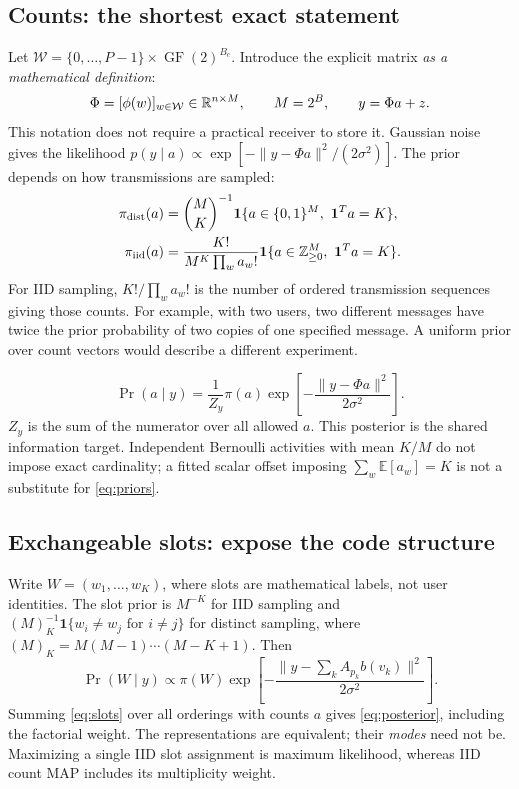 \documentclass[10pt,a4paper]{article}
\newcommand{\E}{\mathbb E}
\newcommand{\GF}{\operatorname{GF}}
\newcommand{\calW}{\mathcal W}
\newcommand{\ind}{\mathbf 1}
\begin{document}
\subsection{Counts: the shortest exact statement}
Let $\calW=\{0,\ldots,P-1\}\times\GF(2)^{B_c}$. Introduce the explicit matrix
\emph{as a mathematical definition}:
\begin{equation}
 \Phi=[\phi(w)]_{w\in\calW}\in\R^{n\times M},\qquad M=2^B,\qquad y=\Phi a+z.
\end{equation}
This notation does not require a practical receiver to store it. Gaussian noise gives the likelihood
$p(y\mid a)\propto\exp[-\|y-\Phi a\|^2/(2\sigma^2)]$. The prior depends on how transmissions are sampled:
\begin{align}
 \pi_{\rm dist}(a)&=\binom{M}{K}^{-1}\ind\{a\in\{0,1\}^M,\ \one^Ta=K\},\\
 \pi_{\rm iid}(a)&=\frac{K!}{M^K\prod_w a_w!}
                   \ind\{a\in\Z_{\geq0}^M,\ \one^Ta=K\}.
 \label{eq:priors}
\end{align}
For IID sampling, $K!/\prod_w a_w!$ is the number of ordered transmission sequences giving those counts.
For example, with two users, two different messages have twice the prior probability of two copies of one specified
message. A uniform prior over count vectors would describe a different experiment.

\begin{equation}
 \boxed{\Pr(a\mid y)=\frac{1}{Z_y}\pi(a)
          \exp\!\left[-\frac{\|y-\Phi a\|^2}{2\sigma^2}\right].}
 \label{eq:posterior}
\end{equation}
$Z_y$ is the sum of the numerator over all allowed $a$. This posterior is the shared information target.
Independent Bernoulli activities with mean $K/M$ do not impose exact cardinality; a fitted scalar offset imposing
$\sum_w\E[a_w]=K$ is not a substitute for \eqref{eq:priors}.

\subsection{Exchangeable slots: expose the code structure}
Write $W=(w_1,\ldots,w_K)$, where slots are mathematical labels, not user identities. The slot prior is $M^{-K}$ for
IID sampling and $(M)_K^{-1}\ind\{w_i\ne w_j\text{ for }i\ne j\}$ for distinct sampling, where
$(M)_K=M(M-1)\cdots(M-K+1)$. Then
\begin{equation}
 \Pr(W\mid y)\propto\pi(W)
       \exp\!\left[-\frac{\|y-\sum_k A_{p_k}b(v_k)\|^2}{2\sigma^2}\right].
 \label{eq:slots}
\end{equation}
Summing \eqref{eq:slots} over all orderings with counts $a$ gives \eqref{eq:posterior}, including the factorial
weight. The representations are equivalent; their \emph{modes} need not be. Maximizing a single IID slot assignment
is maximum likelihood, whereas IID count MAP includes its multiplicity weight.
\end{document}
